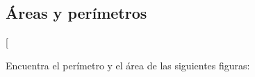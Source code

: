 \documentclass[12pt,addpoints]{repaso}
\begin{document}
\begin{questions}

    \subsection{Áreas y perímetros}

    \ejemplosboxed[{Encuentra el perímetro y el área de las siguientes figuras:

                \begin{multicols}{2}
\end{multicols}}
\end{questions}
\end{document}

